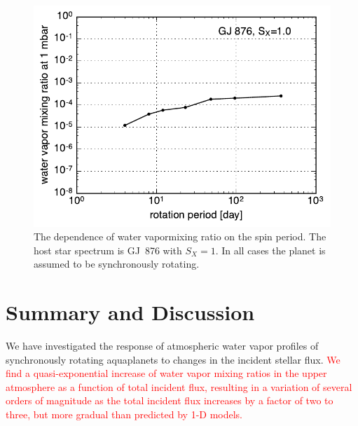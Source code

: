\documentclass[11pt,numberedappendix,twocolappendix,]{emulateapj}
\def\wv{water vapor}
\def\addYF#1{\textcolor{red}{#1}}
\begin{document}
\begin{figure}[!h]
    \begin{center}
    \includegraphics[width=\hsize]{xH2O_Prot.pdf}
    \end{center}
\caption{The dependence of \wv mixing ratio on the spin period. The host star spectrum is GJ~876 with $S_X=1$. In all cases the planet is assumed to be synchronously rotating. }
\label{fig:changeP}
\end{figure}



\section{Summary and Discussion}
\label{s:summary}

We have investigated the response of atmospheric \wv{} profiles of synchronously rotating aquaplanets to changes in the incident stellar flux. 
\addYF{We find a quasi-exponential increase of \wv{} mixing ratios in the upper atmosphere as a function of total incident flux, resulting in a variation of several orders of magnitude as the total incident flux increases by a factor of two to three,  but more gradual than predicted by 1-D models. }
\end{document}
